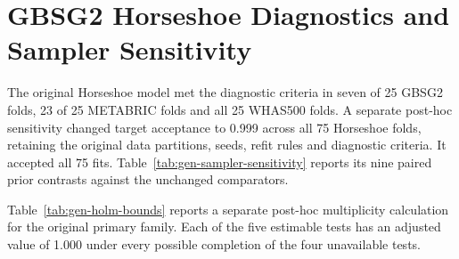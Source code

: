 \chapter{GBSG2 Horseshoe Diagnostics and Sampler Sensitivity}\label{appendix-g-gbsg2-horseshoe-failure-and-recovery}\label{app:horseshoe}

The original Horseshoe model met the diagnostic criteria in seven of 25 GBSG2 folds, 23 of 25 METABRIC folds and all 25 WHAS500 folds. A separate post-hoc sensitivity changed target acceptance to 0.999 across all 75 Horseshoe folds, retaining the original data partitions, seeds, refit rules and diagnostic criteria. It accepted all 75 fits. Table~\ref{tab:gen-sampler-sensitivity} reports its nine paired prior contrasts against the unchanged comparators.



Table~\ref{tab:gen-holm-bounds} reports a separate post-hoc multiplicity calculation for the original primary family. Each of the five estimable tests has an adjusted value of 1.000 under every possible completion of the four unavailable tests.


